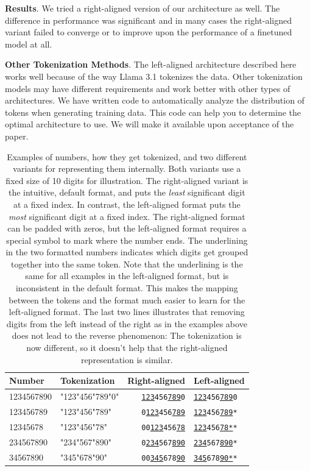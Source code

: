 \documentclass[11pt]{article}
\begin{document}
\textbf{Results}.
We tried a right-aligned version of our architecture as well. The difference in performance was significant and in many cases the right-aligned variant failed to converge or to improve upon the performance of a finetuned model at all.


\textbf{Other Tokenization Methods}.
The left-aligned architecture described here works well because of the way Llama 3.1 tokenizes the data.
Other tokenization models may have different requirements and work better with other types of architectures.
We have written code to automatically analyze the distribution of tokens when generating training data. This code can help you to determine the optimal architecture to use. We will make it available upon acceptance of the paper.



\begin{table}
    \centering
    \begin{tabular}{|l|l|r|l|}
        \hline
        Number & Tokenization & Right-aligned & Left-aligned \\
        \hline
        1234567890 & "123"456"789"0" & \texttt{\underline{123}456\underline{789}0} & \texttt{\underline{123}456\underline{789}0} \\
        123456789 & "123"456"789" & \texttt{0\underline{123}456\underline{789}} & \texttt{\underline{123}456\underline{789}*} \\
        12345678 & "123"456"78" & \texttt{00\underline{123}456\underline{78}} & \texttt{\underline{123}456\underline{78*}*} \\
        234567890 & "234"567"890" & \texttt{0\underline{234}567\underline{890}} & \texttt{\underline{234}567\underline{890}*} \\
        34567890 & "345"678"90" & \texttt{00\underline{345}678\underline{90}} & \texttt{\underline{345}678\underline{90*}*} \\
        \hline
    \end{tabular}
    \caption{
    Examples of numbers, how they get tokenized, and two different variants for representing them internally. Both variants use a fixed size of 10 digits for illustration. The right-aligned variant is the intuitive, default format, and puts the \emph{least} significant digit at a fixed index. In contrast, the left-aligned format puts the \emph{most} significant digit at a fixed index. The right-aligned format can be padded with zeros, but the left-aligned format requires a special symbol to mark where the number ends.
    The underlining in the two formatted numbers indicates which digits get grouped together into the same token. Note that the underlining is the same for all examples in the left-aligned format, but is inconsistent in the default format. This makes the mapping between the tokens and the format much easier to learn for the left-aligned format.
    The last two lines illustrates that removing digits from the left instead of the right as in the examples above does not lead to the reverse phenomenon: The tokenization is now different, so it doesn't help that the right-aligned representation is similar.
    }
    \label{tab:tokenization_examples}
\end{table}
\end{document}
